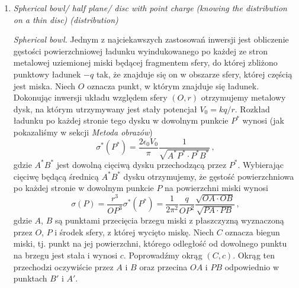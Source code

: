 \documentclass[../main.tex]{subfiles}
\begin{document}
\begin{enumerate}
    \item \textit{Spherical bowl/ half plane/ disc with point charge (knowing the distribution on a thin disc) (distribution)}
    \medskip
    
    
    \textit{Spherical bowl.} Jednym z najciekawszych zastosowań inwersji jest obliczenie gęstości powierzchniowej ładunku wyindukowanego po każdej ze stron metalowej uziemionej miski będącej fragmentem sfery, do której zbliżono punktowy ładunek \(-q\) tak, że znajduje się on w obszarze sfery, której częścią jest miska. Niech \(O\) oznacza punkt, w którym znajduje się ładunek. Dokonując inwersji układu względem sfery \((O,r)\) otrzymujemy metalowy dysk, na którym utrzymywany jest stały potencjał \(V_0=kq/r\). Rozkład ładunku po każdej stronie tego dysku w dowolnym punkcie \(P^*\) wynosi (jak pokazaliśmy w sekcji \textit{Metoda obrazów})
    \begin{equation*}
        \sigma^*(P^*)=\frac{2\epsilon_0V_0}{\pi}\frac{1}{\sqrt{A^*P^*\cdot P^*B^*}}\,,
    \end{equation*}
    gdzie \(A^*B^*\) jest dowolną cięciwą dysku przechodzącą przez \(P^*\). Wybierając cięciwę będącą średnicą \(A^*B^*\) dysku otrzymujemy, że gęstość powierzchniowa po każdej stronie w dowolnym punkcie \(P\) na powierzchni miski wynosi
    \begin{equation*}
        \sigma(P)=\frac{r^3}{OP^3}\sigma^*(P^*)=\frac{1}{2\pi^2}\frac{q}{OP^2}\frac{\sqrt{OA\cdot OB}}{\sqrt{PA\cdot PB}}\,,
    \end{equation*}
    gdzie \(A\), \(B\) są punktami przecięcia brzegu miski z płaszczyzną wyznaczoną przez \(O\), \(P\) i środek sfery, z której wycięto miskę. Niech \(C\) oznacza biegun miski, tj. punkt na jej powierzchni, którego odległość od dowolnego punktu na brzegu jest stała i wynosi \(c\). Poprowadźmy okrąg \((C,c)\). Okrąg ten przechodzi oczywiście przez \(A\) i \(B\) oraz przecina \(OA\) i \(PB\) odpowiednio w punktach \(B'\) i \(A'\).
    \begin{figure}[ht]
        \centering
\end{figure}
\end{enumerate}
\end{document}
